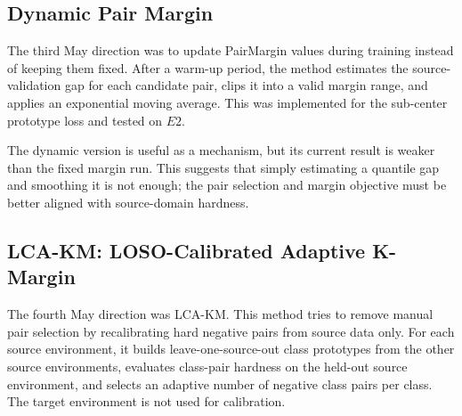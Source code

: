 \documentclass[11pt]{article}
\begin{document}
\subsection{Dynamic Pair Margin}

The third May direction was to update PairMargin values during training instead of keeping them fixed. After a warm-up period, the method estimates the source-validation gap for each candidate pair, clips it into a valid margin range, and applies an exponential moving average. This was implemented for the sub-center prototype loss and tested on $E2$.

\begin{table}[H]
\centering
\small
\caption{Dynamic pair-margin experiments on target $E2$, seed 42.}
\label{tab:dynamic_margin}
%
\end{table}

The dynamic version is useful as a mechanism, but its current result is weaker than the fixed margin run. This suggests that simply estimating a quantile gap and smoothing it is not enough; the pair selection and margin objective must be better aligned with source-domain hardness.

\subsection{LCA-KM: LOSO-Calibrated Adaptive K-Margin}

The fourth May direction was LCA-KM. This method tries to remove manual pair selection by recalibrating hard negative pairs from source data only. For each source environment, it builds leave-one-source-out class prototypes from the other source environments, evaluates class-pair hardness on the held-out source environment, and selects an adaptive number of negative class pairs per class. The target environment is not used for calibration.
\end{document}
